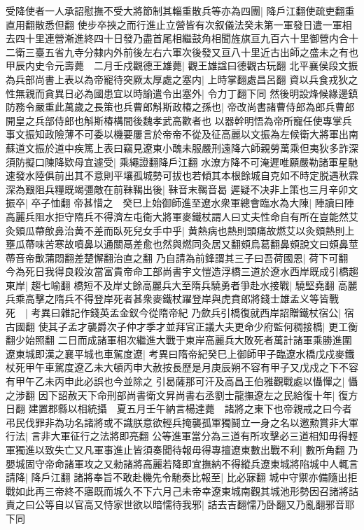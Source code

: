 受降使者一人承詔慰撫不受大將節制其輜重散兵等亦為四團|{
	降戶江翻使疏吏翻重直用翻散悉但翻}
使步卒挾之而行進止立營皆有次叙儀法癸未第一軍發日遣一軍相去四十里連營漸進終四十日發乃盡首尾相繼鼓角相聞旌旗亘九百六十里御營内合十二衛三臺五省九寺分隸内外前後左右六軍次後發又亘八十里近古出師之盛未之有也　甲辰内史令元壽薨　二月壬戍觀德王雄薨|{
	觀王雄諡曰德觀古玩翻}
北平襄侯段文振為兵部尚書上表以為帝寵待突厥太厚處之塞内|{
	上時掌翻處昌呂翻}
資以兵食戎狄之性無親而貪異日必為國患宜以時諭遣令出塞外|{
	令力丁翻下同}
然後明設烽候緣邊鎮防務令嚴重此萬歲之長策也兵曹郎斛斯政椿之孫也|{
	帝改尚書諸曹侍郎為郎兵曹郎開皇之兵部侍郎也斛斯椿構間後魏孝武高歡者也}
以器幹明悟為帝所寵任使專掌兵事文振知政險薄不可委以機要屢言於帝帝不從及征高麗以文振為左候衛大將軍出南蘇道文振於道中疾篤上表曰竊見遼東小醜未服嚴刑遠降六師親勞萬乘但夷狄多詐深須防擬口陳降欵母宜遽受|{
	乘繩證翻降戶江翻}
水潦方降不可淹遲唯願嚴勒諸軍星馳速發水陸俱前出其不意則平壤孤城勢可拔也若傾其本根餘城自克如不時定脱遇秋霖深為艱阻兵糧既竭彊敵在前靺鞨出後|{
	靺音末鞨音曷}
遲疑不决非上策也三月辛卯文振卒|{
	卒子恤翻}
帝甚惜之　癸巳上始御師進至遼水衆軍總會臨水為大陳|{
	陣讀曰陣}
高麗兵阻水拒守隋兵不得濟左屯衛大將軍麥鐵杖謂人曰丈夫性命自有所在豈能然艾灸頞瓜蔕歕鼻治黄不差而臥死兒女手中乎|{
	黄熱病也熱則頭痛故燃艾以灸頞熱則上壅瓜蔕味苦寒故噴鼻以通關鬲差愈也然與燃同灸居又翻頞烏葛翻鼻頞說文曰頞鼻莖蔕音帝歕蒲悶翻差楚懈翻治直之翻}
乃自請為前鋒謂其三子曰吾荷國恩|{
	荷下可翻}
今為死日我得良殺汝當富貴帝命工部尚書宇文愷造浮橋三道於遼水西岸既成引橋趨東岸|{
	趨七喻翻}
橋短不及岸丈餘高麗兵大至隋兵驍勇者爭赴水接戰|{
	驍堅堯翻}
高麗兵乘高擊之隋兵不得登岸死者甚衆麥鐵杖躍登岸與虎賁郎將錢士雄孟义等皆戰死　|{
	考異曰雜記作錢英孟金釵今從隋帝紀}
乃歛兵引橋復就西岸詔贈鐵杖宿公|{
	宿古國翻}
使其子孟才襲爵次子仲才季才並拜官正議大夫更命少府監何稠接橋|{
	更工衡翻少始照翻}
二日而成諸軍相次繼進大戰于東岸高麗兵大敗死者萬計諸軍乘勝進圍遼東城即漢之襄平城也車駕度遼|{
	考異曰隋帝紀癸巳上御師甲子臨遼水橋戊戍麥鐵杖死甲午車駕度遼乙未大頓丙申大赦按長歷是月庚辰朔不容有甲子又戊戍之下不容有甲午乙未丙申此必誤也今並除之}
引曷薩那可汗及高昌王伯雅觀戰處以懾憚之|{
	懾之涉翻}
因下詔赦天下命刑部尚書衛文昇尚書右丞劉士龍撫遼左之民給復十年|{
	復方日翻}
建置郡縣以相統攝　夏五月壬午納言楊達薨　諸將之東下也帝親戒之曰今者弔民伐罪非為功名諸將或不識朕意欲輕兵掩襲孤軍獨鬪立一身之名以邀勲賞非大軍行法|{
	言非大軍征行之法將即亮翻}
公等進軍當分為三道有所攻擊必三道相知毋得輕軍獨進以致失亡又凡軍事進止皆須奏聞待報毋得專擅遼東數出戰不利|{
	數所角翻}
乃嬰城固守帝命諸軍攻之又勑諸將高麗若降即宜撫納不得縱兵遼東城將陷城中人輒言請降|{
	降戶江翻}
諸將奉旨不敢赴機先令馳奏比報至|{
	比必寐翻}
城中守禦亦備隨出拒戰如此再三帝終不寤既而城久不下六月己未帝幸遼東城南觀其城池形勢因召諸將詰責之曰公等自以官高又恃家世欲以暗懦待我邪|{
	詰去吉翻懦乃卧翻又乃亂翻邪音耶下同}
